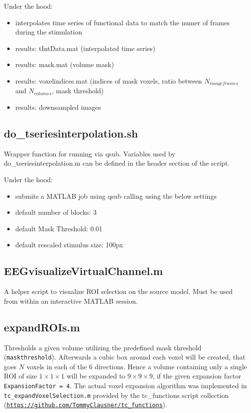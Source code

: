 \documentclass[12pt,a4paper]{scrartcl}
\begin{document}
\noindent Under the hood:
\begin{itemize}
\item interpolates time series of functional data to match the numer of frames during the stimulation
\item results: tIntData.mat (interpolated time series)
\item results: mask.mat (volume mask)
\item results: voxelindices.mat (indices of mask voxels, ratio between $N_{imageframes}$ and $N_{volumes}$, mask threshold)
\item results: downsampled images
\end{itemize}

\subsection{do\_tseriesinterpolation.sh}
\label{sh:tseriesinterp}
Wrapper function for running \texttt{} via qsub. Variables used by do\_tseriesinterpolation.m can be defined in the header section of the script.

\noindent Under the hood:
\begin{itemize}
\item submits a MATLAB job using qsub calling \texttt{} using the below settings
\item default number of blocks: 3
\item default Mask Threshold: 0.01
\item default rescaled stimulus size: 100px
\end{itemize}

\subsection{EEGvisualizeVirtualChannel.m}
\label{m:visVirtChan}
A helper script to visualize ROI selection on the source model. Must be used from within an interactive MATLAB session.

\subsection{expandROIs.m}
\label{m:expROI}
Thresholds a given volume utilizing the predefined mask threshold (\texttt{maskthreshold}). Afterwards a cubic box around each voxel will be created, that goes $N$ voxels in each of the 6 directions. Hence a volume containing only a single ROI of size $1\times1\times1$ will be expanded to $9\times9\times9$, if the given expansion factor \texttt{ExpansionFactor = 4}. The actual voxel expansion algorithm was implemented in \texttt{tc\_expandVoxelSelection.m} provided by the tc\_functions script collection (\href{https://github.com/TommyClausner/tc\_functions}{\nolinkurl{https://github.com/TommyClausner/tc\_functions}}).\\
\end{document}

